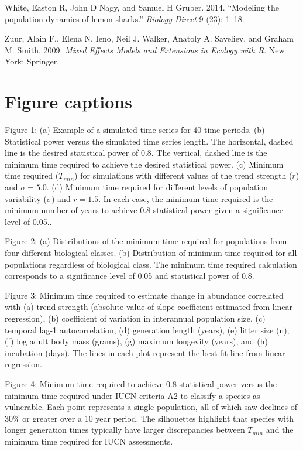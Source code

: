 \documentclass[12pt,]{article}
\begin{document}
\hypertarget{ref-White2014}{}
White, Easton R, John D Nagy, and Samuel H Gruber. 2014. ``Modeling the
population dynamics of lemon sharks.'' \emph{Biology Direct} 9 (23):
1--18.

\hypertarget{ref-Zuur2009}{}
Zuur, Alain F., Elena N. Ieno, Neil J. Walker, Anatoly A. Saveliev, and
Graham M. Smith. 2009. \emph{Mixed Effects Models and Extensions in
Ecology with R}. New York: Springer.

\clearpage

\pagebreak

\section{Figure captions}\label{figure-captions}

Figure 1: (a) Example of a simulated time series for 40 time periods.
(b) Statistical power versus the simulated time series length. The
horizontal, dashed line is the desired statistical power of 0.8. The
vertical, dashed line is the minimum time required to achieve the
desired statistical power. (c) Minimum time required (\(T_{min}\)) for
simulations with different values of the trend strength (\(r\)) and
\(\sigma = 5.0\). (d) Minimum time required for different levels of
population variability (\(\sigma\)) and \(r=1.5\). In each case, the
minimum time required is the minimum number of years to achieve 0.8
statistical power given a significance level of 0.05..

Figure 2: (a) Distributions of the minimum time required for populations
from four different biological classes. (b) Distribution of minimum time
required for all populations regardless of biological class. The minimum
time required calculation corresponds to a significance level of 0.05
and statistical power of 0.8.

Figure 3: Minimum time required to estimate change in abundance
correlated with (a) trend strength (absolute value of slope coefficient
estimated from linear regression), (b) coefficient of variation in
interannual population size, (c) temporal lag-1 autocorrelation, (d)
generation length (years), (e) litter size (n), (f) log adult body mass
(grams), (g) maximum longevity (years), and (h) incubation (days). The
lines in each plot represent the best fit line from linear regression.

Figure 4: Minimum time required to achieve 0.8 statistical power versus
the minimum time required under IUCN criteria A2 to classify a species
as vulnerable. Each point represents a single population, all of which
saw declines of 30\% or greater over a 10 year period. The silhouettes
highlight that species with longer generation times typically have
larger discrepancies between \(T_{min}\) and the minimum time required
for IUCN assessments.
\end{document}
